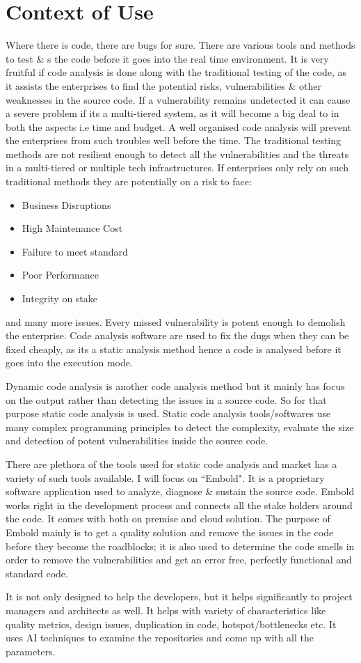 \section{Context of Use}
	Where there is code, there are bugs for sure. There are various tools and methods to test \& s the code before it goes into the real time environment. It is very fruitful if code analysis is done along with the traditional testing of the code, as it assists the enterprises to find the potential risks, vulnerabilities \& other weaknesses in the source code. If a vulnerability remains undetected it can cause a severe problem if its a multi-tiered system, as it will become a big deal to in both the aspects i.e time and budget. A well organised code analysis will prevent the enterprises from such troubles well before the time. 
	The traditional testing methods are not resilient enough to detect all the vulnerabilities and the threats in a multi-tiered or multiple tech infrastructures. If enterprises only rely on such traditional methods they are potentially on a risk to face:
	\begin{itemize}
	\item Business Disruptions
	\item High Maintenance Cost
	\item Failure to meet standard
	\item Poor Performance
	\item Integrity on stake
	\end{itemize}
and many more issues. Every missed vulnerability is potent enough to demolish the enterprise. Code analysis software are used to fix the dugs when they can be fixed cheaply, as its a static analysis method hence a code is analysed before it goes into the execution mode. \par
Dynamic code analysis is another code analysis method but it mainly has focus on the output rather than detecting the issues in a source code. So for that purpose static code analysis is used. Static code analysis tools/softwares use many complex programming principles to detect the complexity, evaluate the size and detection of potent vulnerabilities inside the source code.\par
There are plethora of the tools used for static code analysis and market has a variety of such tools available. I will focus on ``Embold". It is a proprietary software application used to analyze, diagnose \& sustain the source code. Embold works right in the development process and connects all the stake holders around the code. It comes with both on premise and cloud solution. The purpose of Embold mainly is to get a quality solution and remove the issues in the code before they become the roadblocks; it is also used to determine the code smells in order to remove the vulnerabilities and get an error free, perfectly functional and standard code. \par
It is not only designed to help the developers, but it helps significantly to project managers and architects as well. It helps with variety of characteristics like quality metrics, design issues, duplication in code, hotspot/bottlenecks etc. It uses AI techniques to examine the repositories and come up with all the parameters.
 
